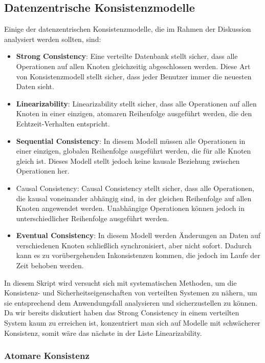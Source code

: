 \subsection{Datenzentrische Konsistenzmodelle}
Einige der datenzentrischen Konsistenzmodelle, die im Rahmen der Diskussion analysiert werden sollten, sind:
\begin{itemize}
\item \textbf{Strong Consistency}: Eine verteilte Datenbank stellt sicher, dass alle Operationen auf allen Knoten gleichzeitig abgeschlossen werden. Diese Art von Konsistenzmodell stellt sicher, dass jeder Benutzer immer die neuesten Daten sieht.
\item \textbf{Linearizability}: Linearizability stellt sicher, dass alle Operationen auf allen Knoten in einer einzigen, atomaren Reihenfolge ausgeführt werden, die den Echtzeit-Verhalten entspricht.
\item \textbf{Sequential Consistency}: In diesem Modell müssen alle Operationen in einer einzigen, globalen Reihenfolge ausgeführt werden, die für alle Knoten gleich ist. Dieses Modell stellt jedoch keine kausale Beziehung zwischen Operationen her.
\item Causal Consistency: Causal Consistency stellt sicher, dass alle Operationen, die kausal voneinander abhängig sind, in der gleichen Reihenfolge auf allen Knoten angewendet werden. Unabhängige Operationen können jedoch in unterschiedlicher Reihenfolge ausgeführt werden.
\item \textbf{Eventual Consistency}: In diesem Modell werden Änderungen an Daten auf verschiedenen Knoten schließlich synchronisiert, aber nicht sofort. Dadurch kann es zu vorübergehenden Inkonsistenzen kommen, die jedoch im Laufe der Zeit behoben werden.
\end{itemize}

In diesem Skript wird versucht sich mit systematischen Methoden, um die Konsistenz- und Sicherheitseigenschaften von verteilten Systemen zu nähern, um sie entsprechend dem Anwendungsfall analysieren und sicherzustellen zu können. Da wir bereits diskutiert haben das Strong Consistency in einem verteilten System kaum zu erreichen ist, konzentriert man sich auf Modelle mit schwächerer Konsistenz, somit wäre das nächste in der Liste Linearizability. 

\subsubsection{Atomare Konsistenz}

